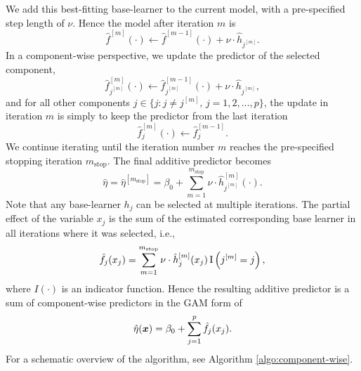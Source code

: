 We add this best-fitting base-learner to the current model, with a pre-specified step length of $\nu$. Hence the model after iteration $m$ is
\begin{equation}
    \hat{f}^{[m]}(\cdot)\gets \hat{f}^{[m-1]}(\cdot)+\nu\cdot\hat{h}_{j^{[m]}}.
\end{equation}
In a component-wise perspective, we update the predictor of the selected component,
\begin{equation}
    \hat{f}_{j^{[m]}}^{[m]}(\cdot)\gets \hat{f}_{j^{[m]}}^{[m-1]}(\cdot)+\nu\cdot\hat{h}_{j^{[m]}},
\end{equation}
and for all other components $j\in\{j\colon j\neq j^{[m]},\,j=1,2,\ldots,p\}$, the update in iteration $m$ is simply
to keep the predictor from the last iteration
\begin{equation}
    \hat{f}_{j}^{[m]}(\cdot)\gets \hat{f}_{j}^{[m-1]}.
\end{equation}
We continue iterating until the iteration number $m$ reaches the pre-specified stopping iteration $m_{\text{stop}}$.
The final additive predictor becomes
\begin{equation}
    \hat{\eta}=\hat{\eta}^{[m_{\text{stop}}]}=\beta_0 + \sum_{m=1}^{m_{\text{stop}}}\nu\cdot\hat{h}_{j^{[m]}}^{[m]}(\cdot).
\end{equation}
Note that any base-learner $h_j$ can be selected at multiple iterations. The partial effect of the variable $x_j$ is the sum of the estimated corresponding base learner in all iterations where it was selected, i.e.,
\begin{equation*}
    \hat{f}_j(x_j)=\sum_{m=1}^{m_{\text{stop}}}\nu\cdot\hat{h}_j^{[m]}(x_j)\operatorname{I}\left(j^{[m]}=j\right),
\end{equation*}
where $I(\cdot)$ is an indicator function. Hence the resulting additive predictor is a sum of component-wise predictors in the GAM form of
\begin{equation}
    \hat{\eta}(\bm{x})=\beta_0+\sum_{j=1}^p \hat{f}_j(x_j).
\end{equation}
For a schematic overview of the algorithm, see Algorithm \ref{algo:component-wise}.

